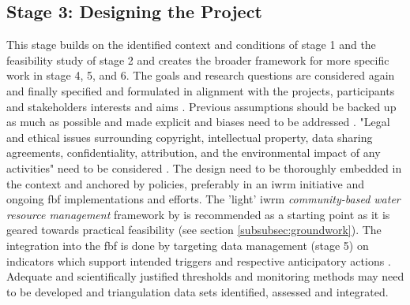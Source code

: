 \subsection{Stage 3: Designing the Project}
This stage builds on the identified context and conditions of stage 1 and the feasibility study of stage 2 and creates the broader framework for more specific work in stage 4, 5, and 6. The goals and research questions are considered again and finally specified and formulated in alignment with the projects, participants and stakeholders interests and aims \autocite{conradReviewCitizenScience2011,fraislCitizenScienceEnvironmental2022,minkmanCitizenScienceWater2015}. Previous assumptions should be backed up as much as possible and made explicit \autocite{silvertownNewDawnCitizen2009} and biases need to be addressed \autocite{escaeuropeancitizenscienceassociationTenPrinciplesCitizen2015,fraislCitizenScienceEnvironmental2022}. "Legal and ethical issues surrounding copyright, intellectual property, data sharing agreements, confidentiality, attribution, and the environmental impact of any activities" need to be considered \autocite{escaeuropeancitizenscienceassociationTenPrinciplesCitizen2015}. The design need to be thoroughly embedded in the context and anchored by policies, preferably in an \acrlong{iwrm} initiative \autocite{cervoniImplementingIntegratedWater2008,sharpeCommunityBasedEcological2006} and ongoing \acrshort{fbf} implementations and efforts. The 'light' \acrshort{iwrm} \textit{community-based water resource management} framework by \autocite{dayCommunitybasedWaterResources2009} is recommended as a starting point as it is geared towards practical feasibility (see section \ref*{subsubsec:groundwork}). The integration into the \acrshort{fbf} is done by targeting data management (stage 5) on indicators which support intended triggers and respective anticipatory actions \autocite{ifrcCommunityBasedSurveillanceGuiding2017}. Adequate and scientifically justified thresholds and monitoring methods may need to be developed and triangulation data sets identified, assessed and integrated. \newline
